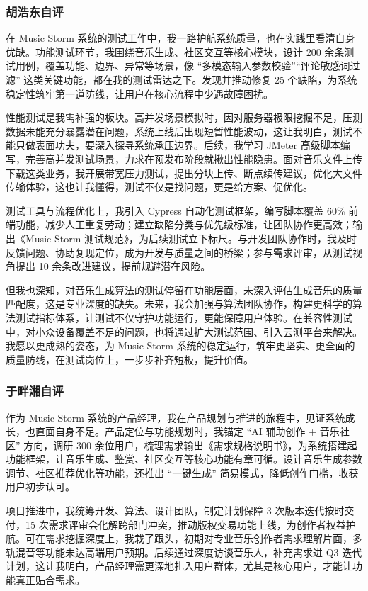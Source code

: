 \documentclass{base}
\numberwithin{figure}{section} %
\begin{document}
\subsubsection{胡浩东自评}

在 Music Storm 系统的测试工作中，我一路护航系统质量，也在实践里看清自身优缺。功能测试环节，我围绕音乐生成、社区交互等核心模块，设计 200 余条测试用例，覆盖功能、边界、异常等场景，像 “多模态输入参数校验”“评论敏感词过滤” 这类关键功能，都在我的测试雷达之下。发现并推动修复 25 个缺陷，为系统稳定性筑牢第一道防线，让用户在核心流程中少遇故障困扰。

性能测试是我需补强的板块。高并发场景模拟时，因对服务器极限挖掘不足，压测数据未能充分暴露潜在问题，系统上线后出现短暂性能波动，这让我明白，测试不能只做表面功夫，要深入探寻系统承压边界。后续，我学习 JMeter 高级脚本编写，完善高并发测试场景，力求在预发布阶段就揪出性能隐患。面对音乐文件上传下载这类业务，我开展带宽压力测试，提出分块上传、断点续传建议，优化大文件传输体验，这也让我懂得，测试不仅是找问题，更是给方案、促优化。

测试工具与流程优化上，我引入 Cypress 自动化测试框架，编写脚本覆盖 60\% 前端功能，减少人工重复劳动；建立缺陷分类与优先级标准，让团队协作更高效；输出《Music Storm 测试规范》，为后续测试立下标尺。与开发团队协作时，我及时反馈问题、协助复现定位，成为开发与质量之间的桥梁；参与需求评审，从测试视角提出 10 余条改进建议，提前规避潜在风险。

但我也深知，对音乐生成算法的测试停留在功能层面，未深入评估生成音乐的质量匹配度，这是专业深度的缺失。未来，我会加强与算法团队协作，构建更科学的算法测试指标体系，让测试不仅守护功能运行，更能保障用户体验。在兼容性测试中，对小众设备覆盖不足的问题，也将通过扩大测试范围、引入云测平台来解决。我愿以更成熟的姿态，为 Music Storm 系统的稳定运行，筑牢更坚实、更全面的质量防线，在测试岗位上，一步步补齐短板，提升价值。


\subsubsection{于畔湘自评}

作为 Music Storm 系统的产品经理，我在产品规划与推进的旅程中，见证系统成长，也直面自身不足。产品定位与功能规划时，我锚定 “AI 辅助创作 + 音乐社区” 方向，调研 300 余位用户，梳理需求输出《需求规格说明书》，为系统搭建起功能框架，让音乐生成、鉴赏、社区交互等核心功能有章可循。设计音乐生成参数调节、社区推荐优化等功能，还推出 “一键生成” 简易模式，降低创作门槛，收获用户初步认可。

项目推进中，我统筹开发、算法、设计团队，制定计划保障 3 次版本迭代按时交付，15 次需求评审会化解跨部门冲突，推动版权交易功能上线，为创作者权益护航。可在需求挖掘深度上，我栽了跟头，初期对专业音乐创作者需求理解片面，多轨混音等功能未达高端用户预期。后续通过深度访谈音乐人，补充需求进 Q3 迭代计划，这让我明白，产品经理需更深地扎入用户群体，尤其是核心用户，才能让功能真正贴合需求。
\end{document}
